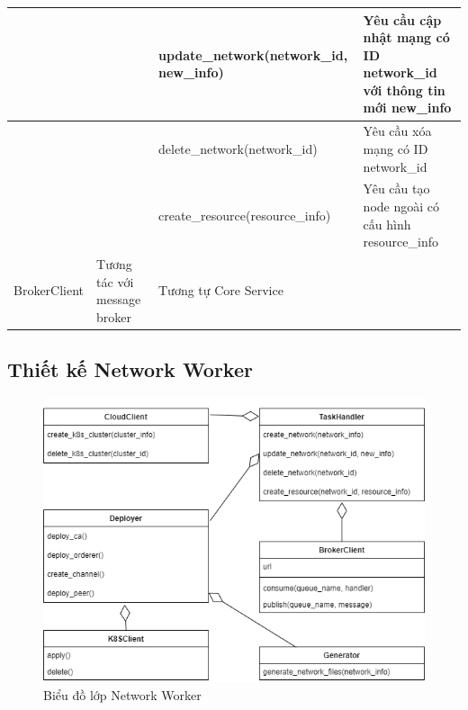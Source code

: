\documentclass[../DoAn.tex]{subfiles}
\begin{document}
\begin{longtable}{|p{}|p{}|p{}|p{}|}
                                                             &                                                                         & update\_network\hspace{0pt}(network\_id, new\_info)        & Yêu cầu cập nhật mạng có ID network\_id với thông tin mới new\_info       \\ \hline
                                                             &                                                                         & delete\_network\hspace{0pt}(network\_id)                   & Yêu cầu xóa mạng có ID network\_id                                        \\ \cline{3-4}
                                                             &                                                                         & create\_resource\hspace{0pt}(resource\_info)               & Yêu cầu tạo node ngoài có cấu hình resource\_info                         \\ \hline
    BrokerClient                                             & Tương tác với message broker                                            & \multicolumn{2}{p{0.6\textwidth}|}{Tương tự Core Service}                                                                             \\ \hline
\end{longtable}

\subsection{Thiết kế Network Worker}

\begin{figure}[H]
    \centering
    \includegraphics[width=0.75\linewidth]{Hinhve/DoAn-ClassNetworkWorker.drawio.png}
    \caption{Biểu đồ lớp Network Worker}
    \label{fig:classNetworkWorker}
\end{figure}
\end{document}
